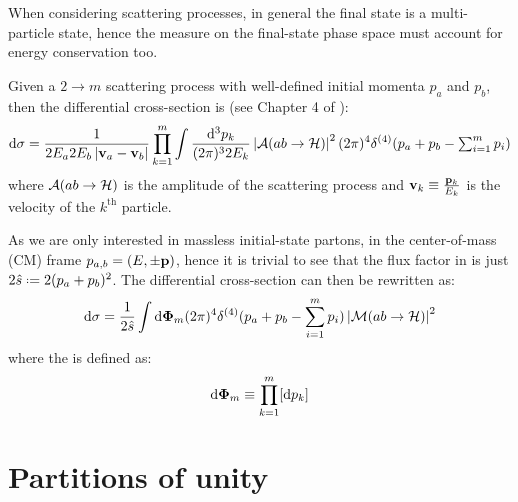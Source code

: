 When considering scattering processes, in general the final state is a multi-particle state, hence the measure on the final-state phase space must account for energy conservation too.

Given a $ 2 \rightarrow m $ scattering process with well-defined initial momenta $ p_a $ and $ p_b $, then the differential cross-section is (see Chapter 4 of \cite{Peskin-1995}):
\begin{equation}
  \mathrm{d}\sigma = \frac{1}{2E_a 2E_b \left\lvert\mathbf{v}_a - \mathbf{v}_b\right\rvert} \prod_{k = 1}^m \int \frac{\mathrm{d}^3p_k}{(2\pi)^3 2E_k} \left\lvert\mathcal{A}(ab \rightarrow \mathcal{H})\right\rvert^2 (2\pi)^4 \delta^{(4)}(p_a + p_b - \textstyle\sum_{i = 1}^m p_i)
  \label{eq:scatt-cr-sec}
\end{equation}
where $ \mathcal{A}(ab \rightarrow \mathcal{H}) $ is the amplitude of the scattering process and $ \mathbf{v}_k \equiv \frac{\mathbf{p}_k}{E_k} $ is the velocity of the $ k^\text{th} $ particle.

As we are only interested in massless initial-state partons, in the center-of-mass (CM) frame $ p_{a,b} = (E, \pm\mathbf{p}) $, hence it is trivial to see that the flux factor in  is just $ 2\hat{s} \defeq 2 (p_a + p_b)^2 $. The differential cross-section can then be rewritten as:
\begin{equation}
  \mathrm{d} \sigma = \frac{1}{2\hat{s}} \int \mathrm{d} \boldsymbol{\Phi}_m (2\pi)^4 \delta^{(4)}(p_a + p_b - \sum_{i = 1}^m p_i) \left\lvert\mathcal{M}(ab \rightarrow \mathcal{H})\right\rvert^2
\end{equation}
where the  is defined as:
\begin{equation}
  \mathrm{d} \boldsymbol{\Phi}_m \equiv \prod_{k = 1}^m [\mathrm{d} p_k]
\end{equation}

\section{Partitions of unity}
\label{sec:unit-part}

